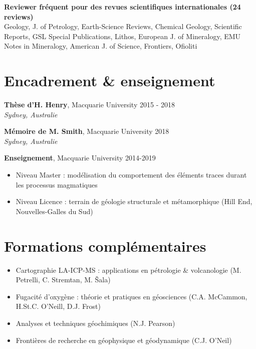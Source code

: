 \documentclass[a4paper,11pt]{article}
\begin{document}
    \textbf{Reviewer fréquent pour des revues scientifiques internationales (24 reviews)}\\
    Geology, J. of Petrology, Earth-Science Reviews, Chemical Geology, Scientific Reports, GSL Special Publications, Lithos, European J. of Mineralogy, EMU Notes in Mineralogy, American J. of Science, Frontiers, Ofioliti

\section{Encadrement \& enseignement}
    \textbf{Thèse d'H. Henry}, Macquarie University
    \hfill {2015 - 2018}\\ 
    \hfill \textit{Sydney, Australie}

    \textbf{Mémoire de M. Smith}, Macquarie University
    \hfill {2018}\\ 
    \hfill \textit{Sydney, Australie}

\textbf{Enseignement}, Macquarie University
\hfill {2014-2019}
    \begin{itemize}[label={},itemsep=0pt,parsep=0pt]
        \item Niveau Master : modélisation du comportement des éléments traces durant les processus magmatiques 
        \item Niveau Licence : terrain de géologie structurale et métamorphique (Hill End, Nouvelles-Galles du Sud)
    \end{itemize}

\section{Formations complémentaires}

    \begin{itemize}[label={},itemsep=0pt,parsep=0pt]
        \item Cartographie LA-ICP-MS : applications en pétrologie \& volcanologie (M. Petrelli, C. Stremtan, M. Šala)
        \item Fugacité d’oxygène : théorie et pratiques en géosciences (C.A. McCammon, H.St.C. O’Neill, D.J. Frost)
        \item Analyses et techniques géochimiques (N.J. Pearson)
        \item Frontières de recherche en géophysique et géodynamique (C.J. O’Neil)
    \end{itemize}
    
\vfill  
{}
\end{document}
